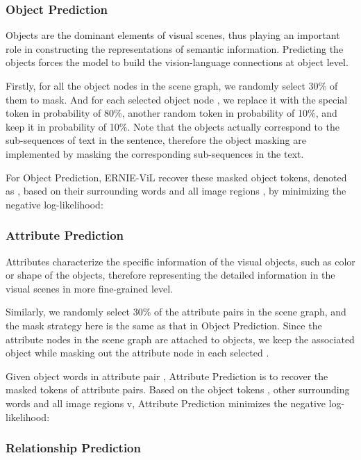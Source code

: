 \documentclass[letterpaper]{article} \usepackage{aaai21}  \usepackage{times}  \usepackage{helvet} \usepackage{courier}  \usepackage[hyphens]{url}  \usepackage{graphicx} \urlstyle{rm} \def\UrlFont{\rm}  \usepackage{natbib}  \usepackage{caption} \frenchspacing  \setlength{\pdfpagewidth}{8.5in}  \setlength{\pdfpageheight}{11in}  \usepackage{cite}
\begin{document}
\subsubsection{Object Prediction}


Objects are the dominant elements of  visual scenes, thus playing an important role in constructing the representations of semantic information. Predicting the objects forces the model to build the vision-language connections at object level. 

Firstly, for all the object nodes in the scene graph, we randomly select 30\% of them to mask. And for each selected object node , we replace it with the special token  in probability of 80\%, another random token in probability of 10\%, and keep it in probability of 10\%. Note that the objects actually correspond to the sub-sequences of text in the sentence, therefore the object masking are implemented by masking the corresponding sub-sequences in the text.

For Object Prediction, ERNIE-ViL recover these masked object tokens, denoted as , based on their surrounding words  and all image regions , by minimizing the negative log-likelihood:




\subsubsection{Attribute Prediction}
Attributes characterize the specific information of the visual objects, such as color or shape of the objects, therefore representing the detailed information in the visual scenes in more fine-grained level.

Similarly, we randomly select 30\% of the attribute pairs in the scene graph, and the mask strategy here is the same as that in Object Prediction. Since the attribute nodes in the scene graph are attached to objects, we keep the associated object while masking out the attribute node  in each selected .

Given object words  in attribute pair , Attribute Prediction is to recover the masked tokens  of attribute pairs. Based on the object tokens  , other surrounding words  and all image regions v, Attribute Prediction minimizes the negative log-likelihood:




\subsubsection{Relationship Prediction}
\end{document}
